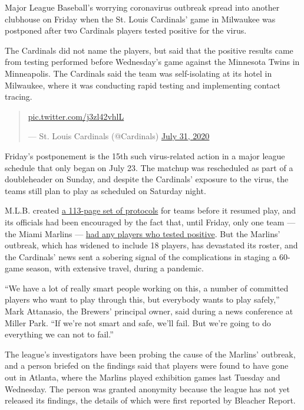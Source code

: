 Major League Baseball's worrying coronavirus outbreak spread into
another clubhouse on Friday when the St. Louis Cardinals' game in
Milwaukee was postponed after two Cardinals players tested positive for
the virus.

The Cardinals did not name the players, but said that the positive
results came from testing performed before Wednesday's game against the
Minnesota Twins in Minneapolis. The Cardinals said the team was
self-isolating at its hotel in Milwaukee, where it was conducting rapid
testing and implementing contact tracing.

\begin{quote}
\href{https://t.co/j3zl42vhlL}{pic.twitter.com/j3zl42vhlL}

--- St. Louis Cardinals (@Cardinals)
\href{https://twitter.com/Cardinals/status/1289243222456201216?ref_src=twsrc\%5Etfw}{July
31, 2020}
\end{quote}

Friday's postponement is the 15th such virus-related action in a major
league schedule that only began on July 23. The matchup was rescheduled
as part of a doubleheader on Sunday, and despite the Cardinals' exposure
to the virus, the teams still plan to play as scheduled on Saturday
night.

M.L.B. created
\href{https://www.nytimes.com/2020/06/22/sports/baseball/mlb-season-schedule-vote.html}{a
113-page set of protocols} for teams before it resumed play, and its
officials had been encouraged by the fact that, until Friday, only one
team --- the Miami Marlins ---
\href{https://www.nytimes.com/2020/07/27/sports/baseball/marlins-game-canceled.html}{had
any players who tested positive}. But the Marlins' outbreak, which has
widened to include 18 players, has devastated its roster, and the
Cardinals' news sent a sobering signal of the complications in staging a
60-game season, with extensive travel, during a pandemic.

``We have a lot of really smart people working on this, a number of
committed players who want to play through this, but everybody wants to
play safely,'' Mark Attanasio, the Brewers' principal owner, said during
a news conference at Miller Park. ``If we're not smart and safe, we'll
fail. But we're going to do everything we can not to fail.''

The league's investigators have been probing the cause of the Marlins'
outbreak, and a person briefed on the findings said that players were
found to have gone out in Atlanta, where the Marlins played exhibition
games last Tuesday and Wednesday. The person was granted anonymity
because the league has not yet released its findings, the details of
which were first reported by Bleacher Report.

